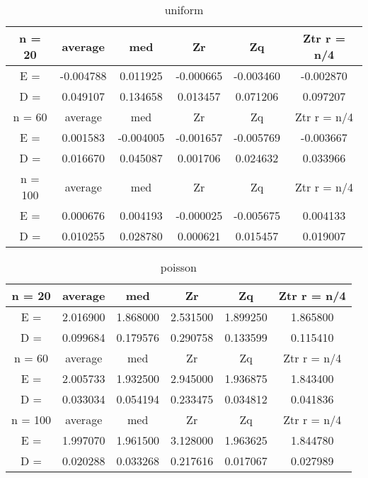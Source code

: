 \documentclass[12pt]{article}
\begin{document}
\begin{table}[H]
\caption{uniform}
\label{tab:my_label4}
\begin{center}
\vspace{5mm}
\begin{tabular}{|c|c|c|c|c|c|}
\hline
n = 20    &average     &med         &Zr          &Zq          &Ztr r = n/4 \\
\hline
E =       &-0.004788   &0.011925    &-0.000665   &-0.003460   &-0.002870   \\
\hline
D =       &0.049107    &0.134658    &0.013457    &0.071206    &0.097207    \\
\hline
n = 60    &average     &med         &Zr          &Zq          &Ztr r = n/4 \\
\hline
E =       &0.001583    &-0.004005   &-0.001657   &-0.005769   &-0.003667   \\
\hline
D =       &0.016670    &0.045087    &0.001706    &0.024632    &0.033966    \\
\hline
n = 100   &average     &med         &Zr          &Zq          &Ztr r = n/4 \\
\hline
E =       &0.000676    &0.004193    &-0.000025   &-0.005675   &0.004133    \\
\hline
D =       &0.010255    &0.028780    &0.000621    &0.015457    &0.019007    \\
\hline
\end{tabular}
\end{center}
\end{table}

\begin{table}[H]
\caption{poisson}
\label{tab:my_label5}
\begin{center}
\vspace{5mm}
\begin{tabular}{|c|c|c|c|c|c|}
\hline
n = 20    &average     &med         &Zr          &Zq          &Ztr r = n/4 \\
\hline
E =       &2.016900    &1.868000    &2.531500    &1.899250    &1.865800    \\
\hline
D =       &0.099684    &0.179576    &0.290758    &0.133599    &0.115410    \\
\hline
n = 60    &average     &med         &Zr          &Zq          &Ztr r = n/4 \\
\hline
E =       &2.005733    &1.932500    &2.945000    &1.936875    &1.843400    \\
\hline
D =       &0.033034    &0.054194    &0.233475    &0.034812    &0.041836    \\
\hline
n = 100   &average     &med         &Zr          &Zq          &Ztr r = n/4 \\
\hline
E =       &1.997070    &1.961500    &3.128000    &1.963625    &1.844780    \\
\hline
D =       &0.020288    &0.033268    &0.217616    &0.017067    &0.027989    \\
\hline
\end{tabular}
\end{center}
\end{table}
\end{document}
